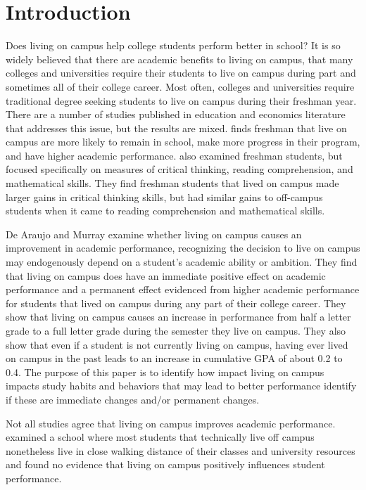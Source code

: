 \documentclass[10pt]{article}
\newcommand{\citee}[1]{\citename{#1} \citeyear{#1}}
\begin{document}
\section{Introduction}
Does living on campus help college students perform better in school?  It is so widely believed that there are academic benefits to living on campus, that many colleges and universities require their students to live on campus during part and sometimes all of their college career.  Most often, colleges and universities require traditional degree seeking students to live on campus during their freshman year.  There are a number of studies published in education and economics literature that addresses this issue, but the results are mixed.  \citee{tsr1993} finds freshman that live on campus are more likely to remain in school, make more progress in their program, and have higher academic performance.  \citee{pascarella1993} also examined freshman students, but focused specifically on measures of critical thinking, reading comprehension, and mathematical skills.  They find freshman students that lived on campus made larger gains in critical thinking skills, but had similar gains to off-campus students when it came to reading comprehension and mathematical skills.

De Araujo and Murray \citeyear{dam2010} examine whether living on campus causes an improvement in academic performance, recognizing the decision to live on campus may endogenously depend on a student's academic ability or ambition.  They find that living on campus does have an immediate positive effect on academic performance and a permanent effect evidenced from higher academic performance for students that lived on campus during any part of their college career.  They show that living on campus causes an increase in performance from half a letter grade to a full letter grade during the semester they live on campus.  They also show that even if a student is not currently living on campus, having ever lived on campus in the past leads to an increase in cumulative GPA of about 0.2 to 0.4.  The purpose of this paper is to identify how impact living on campus impacts study habits and behaviors that may lead to better performance identify if these are immediate changes and/or permanent changes.

Not all studies agree that living on campus improves academic performance.  \citee{delucchi1993} examined a school where most students that technically live off campus nonetheless live in close walking distance of their classes and university resources and found no evidence that living on campus positively influences student performance.
\end{document}
